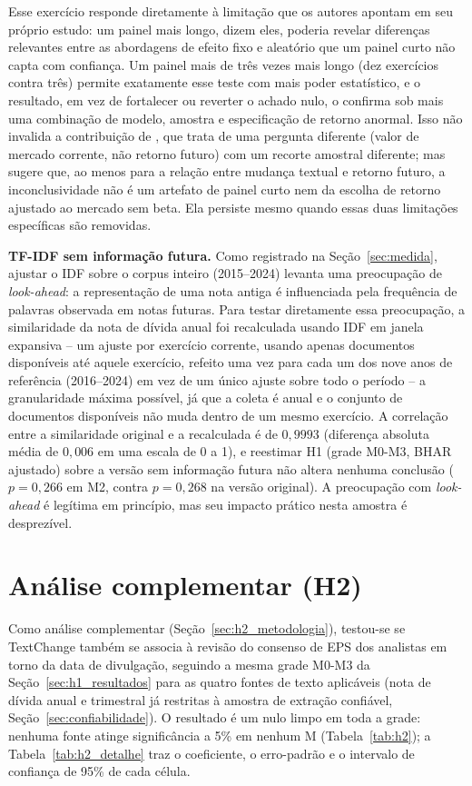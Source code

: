 \documentclass[a4paper,12pt]{report}
\begin{document}
Esse exercício responde diretamente à limitação que os autores apontam em seu próprio estudo: um painel mais longo, dizem eles, poderia revelar diferenças relevantes entre as abordagens de efeito fixo e aleatório que um painel curto não capta com confiança. Um painel mais de três vezes mais longo (dez exercícios contra três) permite exatamente esse teste com mais poder estatístico, e o resultado, em vez de fortalecer ou reverter o achado nulo, o confirma sob mais uma combinação de modelo, amostra e especificação de retorno anormal. Isso não invalida a contribuição de , que trata de uma pergunta diferente (valor de mercado corrente, não retorno futuro) com um recorte amostral diferente; mas sugere que, ao menos para a relação entre mudança textual e retorno futuro, a inconclusividade não é um artefato de painel curto nem da escolha de retorno ajustado ao mercado sem beta. Ela persiste mesmo quando essas duas limitações específicas são removidas.

\textbf{TF-IDF sem informação futura.} Como registrado na Seção~\ref{sec:medida}, ajustar o IDF sobre o corpus inteiro (2015--2024) levanta uma preocupação de \textit{look-ahead}: a representação de uma nota antiga é influenciada pela frequência de palavras observada em notas futuras. Para testar diretamente essa preocupação, a similaridade da nota de dívida anual foi recalculada usando IDF em janela expansiva -- um ajuste por exercício corrente, usando apenas documentos disponíveis até aquele exercício, refeito uma vez para cada um dos nove anos de referência (2016--2024) em vez de um único ajuste sobre todo o período -- a granularidade máxima possível, já que a coleta é anual e o conjunto de documentos disponíveis não muda dentro de um mesmo exercício. A correlação entre a similaridade original e a recalculada é de $0{,}9993$ (diferença absoluta média de $0{,}006$ em uma escala de 0 a 1), e reestimar H1 (grade M0-M3, BHAR ajustado) sobre a versão sem informação futura não altera nenhuma conclusão ($p=0{,}266$ em M2, contra $p=0{,}268$ na versão original). A preocupação com \textit{look-ahead} é legítima em princípio, mas seu impacto prático nesta amostra é desprezível.

\section{Análise complementar (H2)}
\label{sec:h2_resultados}

Como análise complementar (Seção~\ref{sec:h2_metodologia}), testou-se se TextChange também se associa à revisão do consenso de EPS dos analistas em torno da data de divulgação, seguindo a mesma grade M0-M3 da Seção~\ref{sec:h1_resultados} para as quatro fontes de texto aplicáveis (nota de dívida anual e trimestral já restritas à amostra de extração confiável, Seção~\ref{sec:confiabilidade}). O resultado é um nulo limpo em toda a grade: nenhuma fonte atinge significância a 5\% em nenhum M (Tabela~\ref{tab:h2}); a Tabela~\ref{tab:h2_detalhe} traz o coeficiente, o erro-padrão e o intervalo de confiança de 95\% de cada célula.
\end{document}
